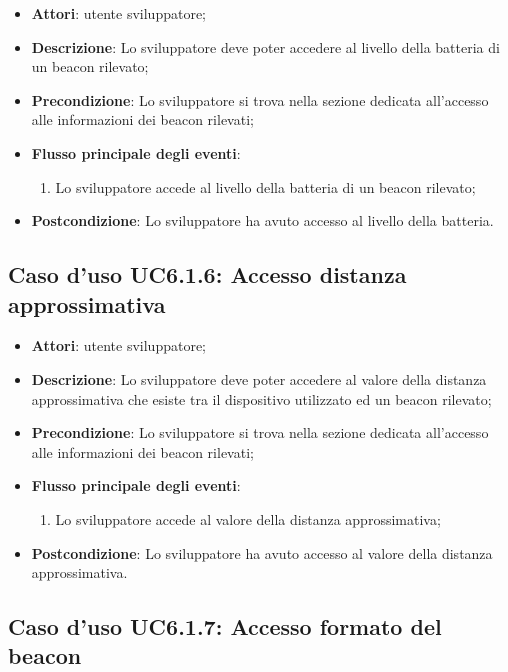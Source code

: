 \documentclass[../AnalisiDeiRequisiti.tex]{subfiles}
\begin{document}
\begin{itemize}
\item \textbf{Attori}: utente sviluppatore;
\item \textbf{Descrizione}: Lo sviluppatore deve poter accedere al livello della batteria di un beacon rilevato; 
      \item \textbf{Precondizione}: Lo sviluppatore si trova nella sezione dedicata all'accesso alle informazioni dei beacon rilevati;

        \item \textbf{Flusso principale degli eventi}:
          \begin{enumerate}
          \item Lo sviluppatore accede al livello della batteria di un beacon rilevato;

      \end{enumerate}
    \item \textbf{Postcondizione}: Lo sviluppatore ha avuto accesso al livello della batteria.
  \end{itemize}
\hypertarget{UC6.1.6}{}
\subsection{Caso d'uso UC6.1.6: Accesso distanza approssimativa}
\begin{itemize}
\item \textbf{Attori}: utente sviluppatore;
\item \textbf{Descrizione}: Lo sviluppatore deve poter accedere al valore della distanza approssimativa che esiste tra il dispositivo utilizzato ed un beacon rilevato; 
      \item \textbf{Precondizione}: Lo sviluppatore si trova nella sezione dedicata all'accesso alle informazioni dei beacon rilevati;

        \item \textbf{Flusso principale degli eventi}:
          \begin{enumerate}
          \item Lo sviluppatore accede al valore della distanza approssimativa;

      \end{enumerate}
    \item \textbf{Postcondizione}: Lo sviluppatore ha avuto accesso al valore della distanza approssimativa.
  \end{itemize}
\hypertarget{UC6.1.7}{}
\subsection{Caso d'uso UC6.1.7: Accesso formato del beacon}
\end{document}
